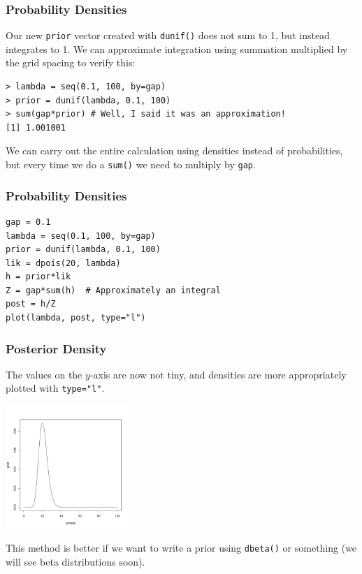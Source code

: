 \documentclass{beamer}
\begin{document}
\begin{frame}[fragile]
\frametitle{Probability Densities}
Our new \texttt{prior} vector created with \texttt{dunif()}
does not sum to 1, but instead integrates to 1. We can approximate integration
using summation multiplied by the grid spacing to verify this:

\begin{verbatim}
> lambda = seq(0.1, 100, by=gap)
> prior = dunif(lambda, 0.1, 100)
> sum(gap*prior) # Well, I said it was an approximation!
[1] 1.001001
\end{verbatim}

We can carry out the entire calculation using densities instead of
probabilities, but every time we do a \texttt{sum()} we need
to multiply by \texttt{gap}.

\end{frame}



\begin{frame}[fragile]
\frametitle{Probability Densities}
\begin{verbatim}
gap = 0.1
lambda = seq(0.1, 100, by=gap)
prior = dunif(lambda, 0.1, 100)
lik = dpois(20, lambda)
h = prior*lik
Z = gap*sum(h)  # Approximately an integral
post = h/Z
plot(lambda, post, type="l")
\end{verbatim}

\end{frame}


\begin{frame}
\frametitle{Posterior Density}
The values on the $y$-axis are now not tiny, and densities are more appropriately plotted with \texttt{type="l"}.
\begin{center}
\includegraphics[width=0.35\textwidth]{images/density.pdf}
\end{center}
This method is better if we want to write a prior using
\texttt{dbeta()} or something (we will see beta distributions soon).

\end{frame}
\end{document}
